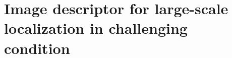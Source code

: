 \documentclass[thesis.tex]{subfiles}
\begin{document}
\acresetall

\graphicspath{{3_side_modality_learning_for_localisation/figures/}}

\chapter[Large-scale localization in challenging condition]{Image descriptor for large-scale localization in challenging condition}\label{chap:3}










\end{document}
